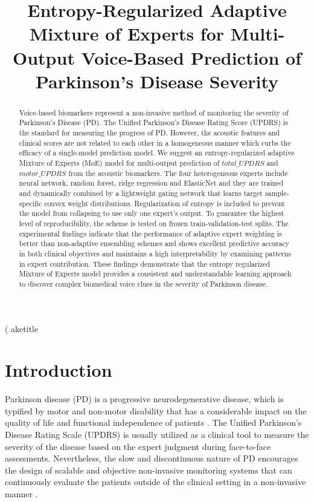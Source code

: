 \documentclass{customIEEEsingle}
\title{Entropy-Regularized Adaptive Mixture of Experts for Multi-Output Voice-Based Prediction of Parkinson’s Disease Severity}
\begin{document}
	\m\left( aketitle
	
	\begin{abstract}
		Voice-based biomarkers represent a non-invasive method of monitoring the severity of Parkinson’s Disease (PD). The Unified Parkinson’s Disease Rating Score (UPDRS) is the standard for measuring the progress of PD. However, the acoustic features and clinical scores are not related to each other in a homogeneous manner which curbs the efficacy of a single-model prediction model. We suggest an entropy-regularized adaptive Mixture of Experts (MoE) model for multi-output prediction of $total\_UPDRS$ and $motor\_UPDRS$ from the acoustic biomarkers. The four heterogeneous experts include neural network, random forest, ridge regression and ElasticNet and they are trained and dynamically combined by a lightweight gating network that learns target sample-specific convex weight distributions. Regularization of entropy is included to prevent the model from collapsing to use only one expert’s output. To guarantee the highest level of reproducibility, the scheme is tested on frozen train-validation-test splits. The experimental findings indicate that the performance of adaptive expert weighting is better than non-adaptive ensembling schemes and shows excellent predictive accuracy in both clinical objectives and maintains a high interpretability by examining patterns in expert contribution. These findings demonstrate that the entropy regularized Mixture of Experts model provides a consistent and understandable learning approach to discover complex biomedical voice clues in the severity of Parkinson disease.
	\end{abstract}
	
	
	\newpage
	\section{Introduction} \label{sec:introduction}
	
	Parkinson disease (PD) is a progressive neurodegenerative disease, which is typified by motor and non-motor disability that has a considerable impact on the quality of life and functional independence of patients \cite{maetzler-2009}. The Unified Parkinson's Disease Rating Scale (UPDRS) is usually utilized as a clinical tool to measure the severity of the disease based on the expert judgment during face-to-face assessments. Nevertheless, the slow and discontinuous nature of PD encourages the design of scalable and objective non-invasive monitoring systems that can continuously evaluate the patients outside of the clinical setting in a non-invasive manner \cite{tsanas-2009, tracy-2019}. 
	
\end{document}
